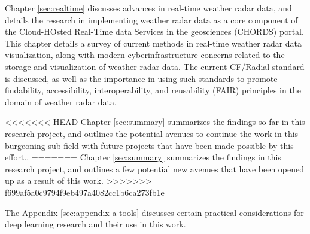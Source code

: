 Chapter \ref{sec:realtime} discusses advances in real-time weather radar data, and details the research in implementing weather radar data as a core component of the Cloud-HOsted Real-Time data Services in the geosciences (CHORDS) portal.
This chapter details a survey of current methods in real-time weather radar data visualization, along with modern cyberinfrastructure concerns related to the storage and visualization of weather radar data.
The current CF/Radial standard is discussed, as well as the importance in using such standards to promote findability, accessibility, interoperability, and reusability (FAIR) principles in the domain of weather radar data.

<<<<<<< HEAD
Chapter \ref{sec:summary} summarizes the findings so far in this research project, and outlines the potential avenues to continue the work in this burgeoning sub-field with future projects that have been made possible by this effort..
=======
Chapter \ref{sec:summary} summarizes the findings in this research project, and outlines a few potential new avenues that have been opened up as a result of this work.
>>>>>>> f699af5a0c9794f9eb497a4082cc1b6ca273fb1e

The Appendix \ref{sec:appendix-a-tools} discusses certain practical considerations for deep learning research and their use in this work.

